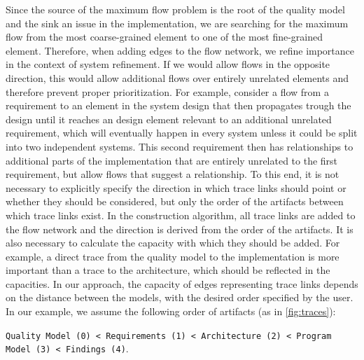 Since the source of the maximum flow problem is the root of the quality model and the sink an issue in the implementation, we are searching for the maximum flow from the most coarse-grained element to one of the most fine-grained element.
Therefore, when adding edges to the flow network, we refine importance in the context of system refinement.
If we would allow flows in the opposite direction, this would allow additional flows over entirely unrelated elements and therefore prevent proper prioritization.
For example, consider a flow from a requirement to an element in the system design that then propagates trough the design until it reaches an design element relevant to an additional unrelated requirement, which will eventually happen in every system unless it could be split into two independent systems.
This second requirement then has relationships to additional parts of the implementation that are entirely unrelated to the first requirement, but allow flows that suggest a relationship.
To this end, it is not necessary to explicitly specify the direction in which trace links should point or whether they should be considered, but only the order of the artifacts between which trace links exist.
In the construction algorithm, all trace links are added to the flow network and the direction is derived from the order of the artifacts.
It is also necessary to calculate the capacity with which they should be added.
For example, a direct trace from the quality model to the implementation is more important than a trace to the architecture, which should be reflected in the capacities.
In our approach, the capacity of edges representing trace links depends on the distance between the models, with the desired order specified by the user.
In our example, we assume the following order of artifacts (as in \autoref{fig:traces}):

\begin{small}
\begin{description}
\item \texttt{Quality Model (0) < Requirements (1) < Archi\-tec\-ture~(2) < Program Model~(3) < Findings~(4)}.
\end{description}
\end{small}

